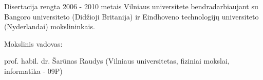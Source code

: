 \newpage
\thispagestyle{empty}                   %

\begin{singlespace}
\noindent\nohyphens{Disertacija rengta 2006 - 2010 metais Vilniaus universitete bendradarbiaujant su Bangoro universiteto (Did\v{z}ioji Britanija) ir Eindhoveno technologij\k{u} universiteto (Nyderlandai) mokslininkais.}

\vspace{1cm}

\noindent Mokslinis vadovas:

\vspace{1cm}

\noindent\nohyphens{ prof. habil. dr. \v{S}ar\={u}nas Raudys (Vilniaus universitetas, fiziniai mokslai, informatika - 09P)}

\end{singlespace}